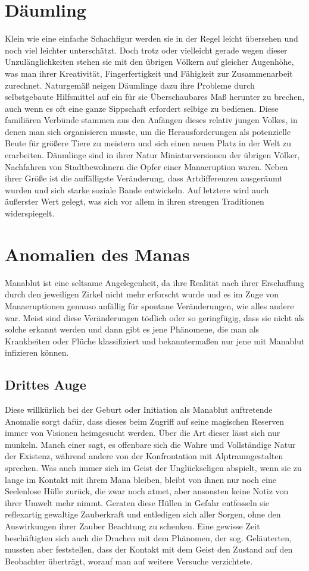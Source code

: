 \documentclass[a4paper,12pt,oneside]{book}
\begin{document}
\chapter{Däumling}
Klein wie eine einfache Schachfigur werden sie in der Regel leicht übersehen und noch viel leichter unterschätzt. Doch trotz oder vielleicht gerade wegen dieser Unzulänglichkeiten stehen sie mit den übrigen Völkern auf gleicher Augenhöhe, was man ihrer Kreativität, Fingerfertigkeit und Fähigkeit zur Zusammenarbeit zurechnet. Naturgemäß neigen Däumlinge dazu ihre Probleme durch selbstgebaute Hilfsmittel auf ein für sie Überschaubares Maß herunter zu brechen, auch wenn es oft eine ganze Sippschaft erfordert selbige zu bedienen. Diese familiären Verbünde stammen aus den Anfängen dieses relativ jungen Volkes, in denen man sich organisieren musste, um die Herausforderungen als potenzielle Beute für größere Tiere zu meistern und sich einen neuen Platz in der Welt zu erarbeiten. Däumlinge sind in ihrer Natur Miniaturversionen der übrigen Völker, Nachfahren von Stadtbewohnern die Opfer einer Manaeruption waren. Neben ihrer Größe ist die auffälligste Veränderung, dass Artdifferenzen ausgeräumt wurden und sich starke soziale Bande entwickeln. Auf letztere wird auch äußerster Wert gelegt, was sich vor allem in ihren strengen Traditionen widerspiegelt.

\chapter{Anomalien des Manas}
Manablut ist eine seltsame Angelegenheit, da ihre Realität nach ihrer Erschaffung durch den jeweiligen Zirkel nicht mehr erforscht wurde und es im Zuge von Manaeruptionen genauso anfällig für spontane Veränderungen, wie alles andere war. Meist sind diese Veränderungen tödlich oder so geringfügig, dass sie nicht als solche erkannt werden und dann gibt es jene Phänomene, die man als Krankheiten oder Flüche klassifiziert und bekanntermaßen nur jene mit Manablut infizieren können.
\section{Drittes Auge}
Diese willkürlich bei der Geburt oder Initiation als Manablut auftretende Anomalie sorgt dafür, dass dieses beim Zugriff auf seine magischen Reserven immer von Visionen heimgesucht werden. Über die Art dieser lässt sich nur munkeln. Manch einer sagt, es offenbare sich die Wahre und Vollständige Natur der Existenz, während andere von der Konfrontation mit Alptraumgestalten sprechen. Was auch immer sich im Geist der Unglückseligen abspielt, wenn sie zu lange im Kontakt mit ihrem Mana bleiben, bleibt von ihnen nur noch eine Seelenlose Hülle zurück, die zwar noch atmet, aber ansonsten keine Notiz von ihrer Umwelt mehr nimmt. Geraten diese Hüllen in Gefahr entfesseln sie reflexartig gewaltige Zauberkraft und entledigen sich aller Sorgen, ohne den Auswirkungen ihrer Zauber Beachtung zu schenken. Eine gewisse Zeit beschäftigten sich auch die Drachen mit dem Phänomen, der sog. Geläuterten, mussten aber feststellen, dass der Kontakt mit dem Geist den Zustand auf den Beobachter überträgt, worauf man auf weitere Versuche verzichtete.
\end{document}
